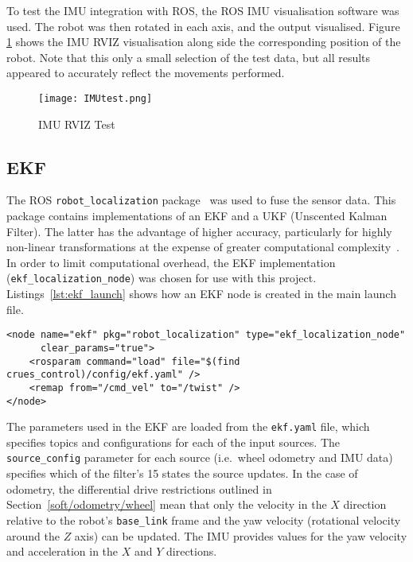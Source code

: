 To test the IMU integration with ROS, the ROS IMU visualisation software was used.
The robot was then rotated in each axis, and the output visualised.
Figure \ref{fig:imu_test} shows the IMU RVIZ visualisation along side the
corresponding position of the robot. Note that this only a small selection
of the test data, but all results appeared to accurately reflect the
movements performed.

\begin{figure}[!ht]
	\centering
	\texttt{[image: IMUtest.png]}
	\caption{IMU RVIZ Test}\label{fig:imu_test}
\end{figure}

\subsection{EKF}\label{soft/odometry/ekf}

The ROS \verb|robot_localization| package~\cite{RosRobotLocalization} was used
to fuse the sensor data. This package contains implementations of
an EKF and a UKF (Unscented Kalman Filter). The latter has the advantage of higher
accuracy, particularly for highly non-linear transformations at the expense of
greater computational complexity~\cite{wan_unscented_2000}. In order to limit
computational overhead, the EKF implementation (\verb|ekf_localization_node|) was
chosen for use with this project. Listings~\ref{lst:ekf_launch} shows how an EKF
node is created in the main launch file.

\begin{lstlisting}[caption={EKF node in ROS launch file}, label={lst:ekf_launch}, style=xml]
<node name="ekf" pkg="robot_localization" type="ekf_localization_node"
      clear_params="true">
    <rosparam command="load" file="$(find crues_control)/config/ekf.yaml" />
    <remap from="/cmd_vel" to="/twist" />
</node>
\end{lstlisting}

The parameters used in the EKF are loaded from the \verb|ekf.yaml| file, which
specifies topics and configurations for each of the input sources. The
\verb|source_config| parameter for each source (i.e.\ wheel odometry and IMU data)
specifies which of the filter's 15 states the source updates. In the case of
odometry, the differential drive restrictions outlined in
Section~\ref{soft/odometry/wheel} mean that only the velocity in the $X$
direction relative to the robot's \verb|base_link| frame
and the yaw velocity (rotational velocity around the $Z$ axis) can be updated.
The IMU provides values for the yaw velocity and acceleration in the $X$ and
$Y$ directions.


